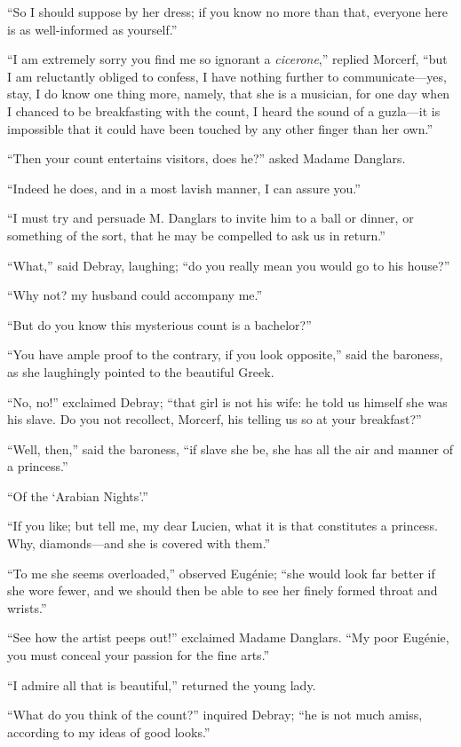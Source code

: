 “So I should suppose by her dress; if you know no more than that,
everyone here is as well-informed as yourself.”

“I am extremely sorry you find me so ignorant a \textit{cicerone},” replied
Morcerf, “but I am reluctantly obliged to confess, I have nothing
further to communicate—yes, stay, I do know one thing more, namely,
that she is a musician, for one day when I chanced to be breakfasting
with the count, I heard the sound of a guzla—it is impossible that it
could have been touched by any other finger than her own.”

“Then your count entertains visitors, does he?” asked Madame Danglars.

“Indeed he does, and in a most lavish manner, I can assure you.”

“I must try and persuade M. Danglars to invite him to a ball or dinner,
or something of the sort, that he may be compelled to ask us in
return.”

“What,” said Debray, laughing; “do you really mean you would go to his
house?”

“Why not? my husband could accompany me.”

“But do you know this mysterious count is a bachelor?”

“You have ample proof to the contrary, if you look opposite,” said the
baroness, as she laughingly pointed to the beautiful Greek.

“No, no!” exclaimed Debray; “that girl is not his wife: he told us
himself she was his slave. Do you not recollect, Morcerf, his telling
us so at your breakfast?”

“Well, then,” said the baroness, “if slave she be, she has all the air
and manner of a princess.”

“Of the ‘Arabian Nights’.”

“If you like; but tell me, my dear Lucien, what it is that constitutes
a princess. Why, diamonds—and she is covered with them.”

“To me she seems overloaded,” observed Eugénie; “she would look far
better if she wore fewer, and we should then be able to see her finely
formed throat and wrists.”

“See how the artist peeps out!” exclaimed Madame Danglars. “My poor
Eugénie, you must conceal your passion for the fine arts.”

“I admire all that is beautiful,” returned the young lady.

“What do you think of the count?” inquired Debray; “he is not much
amiss, according to my ideas of good looks.”


